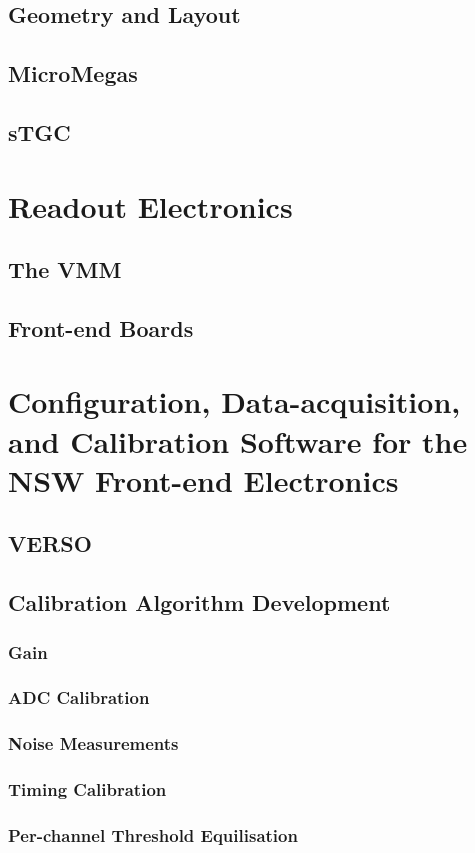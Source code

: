 \subsection{Geometry and Layout}
\subsection{MicroMegas}
\subsection{sTGC}
\section{Readout Electronics}
\subsection{The VMM}
\subsection{Front-end Boards}

\section{Configuration, Data-acquisition, and Calibration Software for the NSW Front-end Electronics}
\subsection{VERSO}
\subsection{Calibration Algorithm Development}
\subsubsection{Gain}
\subsubsection{ADC Calibration}
\subsubsection{Noise Measurements}
\subsubsection{Timing Calibration}
\subsubsection{Per-channel Threshold Equilisation}
